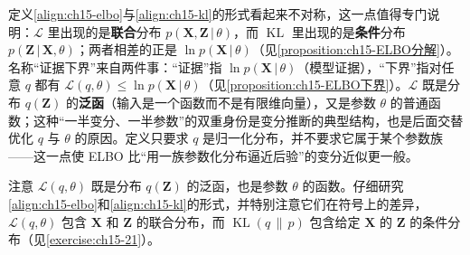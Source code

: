\documentclass[../../main.tex]{subfiles}
\begin{document}
\begin{remark}
定义\eqref{align:ch15-elbo}与\eqref{align:ch15-kl}的形式看起来不对称，这一点值得专门说明：$\mathcal{L}$ 里出现的是\textbf{联合}分布 $p(\bm{X},\bm{Z}\,|\,\theta)$，而 $\operatorname{KL}$ 里出现的是\textbf{条件}分布 $p(\bm{Z}\,|\,\bm{X},\theta)$；两者相差的正是 $\ln p(\bm{X}\,|\,\theta)$（见\cref{proposition:ch15-ELBO分解}）。名称“证据下界”来自两件事：“证据”指 $\ln p(\bm{X}\,|\,\theta)$（模型证据），“下界”指对任意 $q$ 都有 $\mathcal{L}(q,\theta)\leqslant\ln p(\bm{X}\,|\,\theta)$（见\cref{proposition:ch15-ELBO下界}）。$\mathcal{L}$ 既是分布 $q(\bm{Z})$ 的\textbf{泛函}（输入是一个函数而不是有限维向量），又是参数 $\theta$ 的普通函数；这种“一半变分、一半参数”的双重身份是变分推断的典型结构，也是后面交替优化 $q$ 与 $\theta$ 的原因。定义只要求 $q$ 是归一化分布，并不要求它属于某个参数族——这一点使 ELBO 比“用一族参数化分布逼近后验”的变分近似更一般。
\end{remark}

注意 $\mathcal{L}(q,\theta)$ 既是分布 $q(\bm{Z})$ 的泛函，也是参数 $\theta$ 的函数。仔细研究\eqref{align:ch15-elbo}和\eqref{align:ch15-kl}的形式，并特别注意它们在符号上的差异，$\mathcal{L}(q,\theta)$ 包含 $\bm{X}$ 和 $\bm{Z}$ 的联合分布，而 $\operatorname{KL}(q\,\|\,p)$ 包含给定 $\bm{X}$ 的 $\bm{Z}$ 的条件分布（见\cref{exercise:ch15-21}）。
\end{document}
